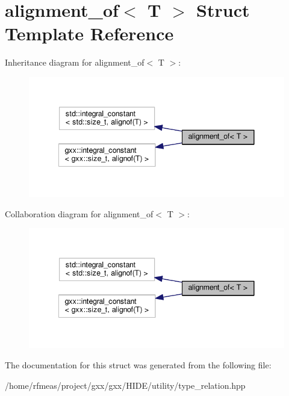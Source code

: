 \hypertarget{structalignment__of}{}\section{alignment\+\_\+of$<$ T $>$ Struct Template Reference}
\label{structalignment__of}


Inheritance diagram for alignment\+\_\+of$<$ T $>$\+:
\nopagebreak
\begin{figure}[H]
\begin{center}
\leavevmode
\includegraphics[width=341pt]{structalignment__of__inherit__graph}
\end{center}
\end{figure}


Collaboration diagram for alignment\+\_\+of$<$ T $>$\+:
\nopagebreak
\begin{figure}[H]
\begin{center}
\leavevmode
\includegraphics[width=341pt]{structalignment__of__coll__graph}
\end{center}
\end{figure}


The documentation for this struct was generated from the following file\+:\begin{DoxyCompactItemize}
\item 
/home/rfmeas/project/gxx/gxx/\+H\+I\+D\+E/utility/type\+\_\+relation.\+hpp\end{DoxyCompactItemize}
